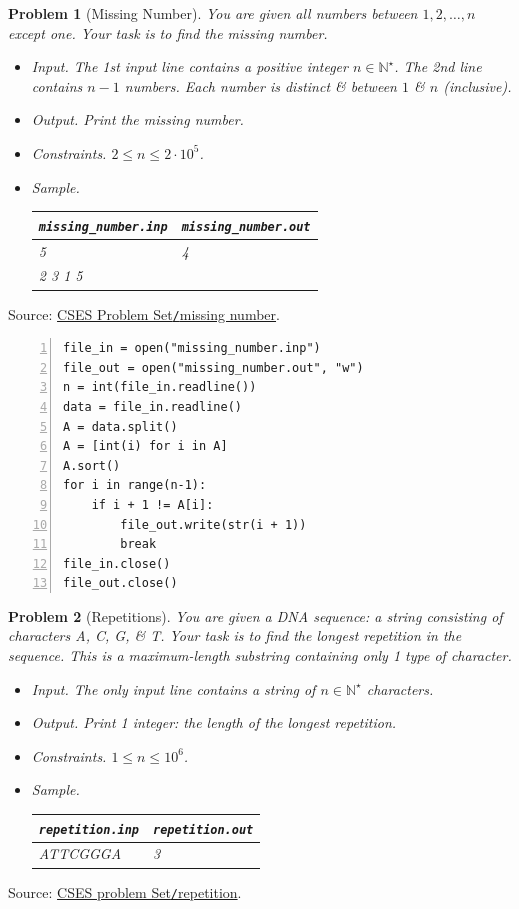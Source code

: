 \documentclass{article}
\newtheorem{problem}{Problem}
\begin{document}
\begin{problem}[Missing Number]
	You are given all numbers between $1,2,\ldots,n$ except one. Your task is to find the missing number.
	\begin{itemize}
		\item {\sf Input.} The 1st input line contains a positive integer $n\in\mathbb{N}^\star$. The 2nd line contains $n - 1$ numbers. Each number is distinct \& between $1$ \& $n$ (inclusive).
		\item {\sf Output.} Print the missing number.
		\item {\sf Constraints.} $2\le n\le2\cdot10^5$.
		\item {\sf Sample.}
		\begin{table}[H]
			\centering
			\begin{tabular}{|l|l|}
				\hline
				\verb|missing_number.inp| & \verb|missing_number.out| \\
				\hline
				5 & 4 \\
				2 3 1 5 & \\
				\hline
			\end{tabular}
		\end{table}
	\end{itemize}
\end{problem}
Source: \href{https://cses.fi/problemset/task/1083}{CSES Problem Set\texttt{/}missing number}.

\begin{Verbatim}[numbers=left,xleftmargin=5mm]
file_in = open("missing_number.inp")
file_out = open("missing_number.out", "w")
n = int(file_in.readline())
data = file_in.readline()
A = data.split()
A = [int(i) for i in A]
A.sort()
for i in range(n-1):
    if i + 1 != A[i]:
        file_out.write(str(i + 1))
        break
file_in.close()
file_out.close()
\end{Verbatim}

\begin{problem}[Repetitions]
	You are given a DNA sequence: a string consisting of characters A, C, G, \& T. Your task is to find the longest repetition in the sequence. This is a maximum-length substring containing only 1 type of character.
	\begin{itemize}
		\item {\sf Input.} The only input line contains a string of $n\in\mathbb{N}^\star$ characters.
		\item {\sf Output.} Print 1 integer: the length of the longest repetition.
		\item {\sf Constraints.} $1\le n\le10^6$.
		\item {\sf Sample.}
		\begin{table}[H]
			\centering
			\begin{tabular}{|l|l|}
				\hline
				\verb|repetition.inp| & \verb|repetition.out| \\
				\hline
				ATTCGGGA & 3 \\
				\hline
			\end{tabular}
		\end{table}
	\end{itemize}	
\end{problem}
Source: \href{https://cses.fi/problemset/task/1069}{CSES problem Set\texttt{/}repetition}.
\end{document}
